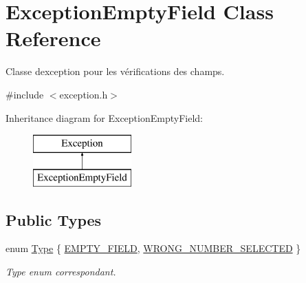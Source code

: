 \hypertarget{class_exception_empty_field}{}\section{Exception\+Empty\+Field Class Reference}
\label{class_exception_empty_field}


Classe d\textquotesingle{}exception pour les vérifications des champs.  




{\ttfamily \#include $<$exception.\+h$>$}

Inheritance diagram for Exception\+Empty\+Field\+:\begin{figure}[H]
\begin{center}
\leavevmode
\includegraphics[height=2.000000cm]{class_exception_empty_field}
\end{center}
\end{figure}
\subsection*{Public Types}
\begin{DoxyCompactItemize}
\item 
enum \hyperlink{class_exception_empty_field_af667c68aa2b6c49ad147004ce9a09584}{Type} \{ \hyperlink{class_exception_empty_field_af667c68aa2b6c49ad147004ce9a09584a6bc8e6b4c1ce816868e981082235660f}{E\+M\+P\+T\+Y\+\_\+\+F\+I\+E\+LD}, 
\hyperlink{class_exception_empty_field_af667c68aa2b6c49ad147004ce9a09584a9b82c514a396c1eb0789ca58c037c273}{W\+R\+O\+N\+G\+\_\+\+N\+U\+M\+B\+E\+R\+\_\+\+S\+E\+L\+E\+C\+T\+ED}
 \}\begin{DoxyCompactList}\small\item\em Type enum correspondant. \end{DoxyCompactList}
\end{DoxyCompactItemize}
